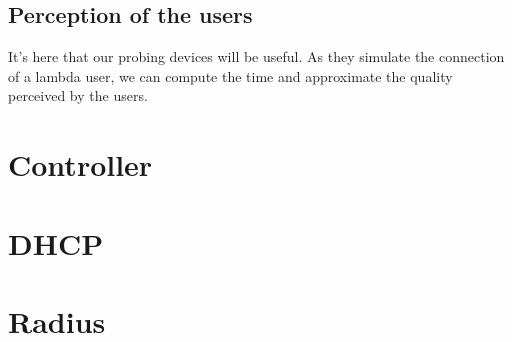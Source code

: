 \subsection{Perception of the users}
It's here that our probing devices will be useful. As they simulate the connection of a lambda user, we can compute the time and approximate the quality perceived by the users. 

\section{Controller}

\section{DHCP}

\section{Radius}


